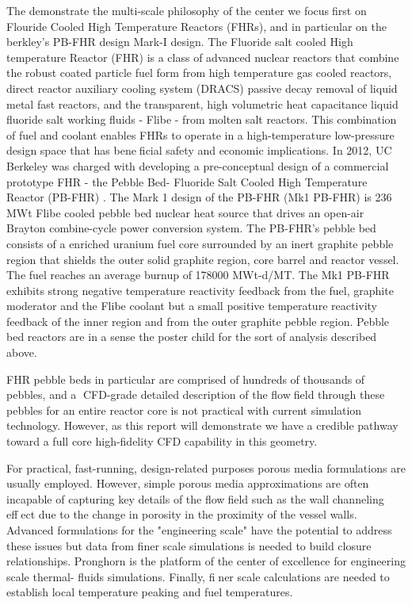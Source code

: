 The demonstrate the multi-scale philosophy of the center we focusfirst on Flouride Cooled High Temperature Reactors (FHRs), and in particular on the berkley's PB-FHR design Mark-I design. The Fluoride salt cooled High temperature Reactor (FHR) is a class of advanced nuclear reactors that combine the robust coated particle fuel form from high temperature gas cooled reactors, direct reactor auxiliary cooling system (DRACS) passive decay removal of liquid metal fast reactors, and the transparent, high volumetric heat capacitance liquid fluoride salt working fluids - Flibe - from molten salt reactors. This combination of fuel and coolant enables FHRs to operate in a high-temperature low-pressure design space that has beneficial safety and economic implications. In 2012, UC Berkeley was charged with developing a pre-conceptual design of a commercial prototype FHR - the Pebble Bed- Fluoride Salt Cooled High Temperature Reactor (PB-FHR) \cite{cisneros2014technical}. The Mark 1 design of the PB-FHR (Mk1 PB-FHR) is 236 MWt Flibe cooled pebble bed nuclear heat source that drives an open-air Brayton combine-cycle power conversion system. The PB-FHR's pebble bed consists of a enriched uranium fuel core surrounded by an inert graphite pebble region that shields the outer solid graphite region, core barrel and reactor vessel. The fuel reaches an average burnup of 178000 MWt-d/MT. The Mk1 PB-FHR exhibits strong negative temperature reactivity feedback from the fuel, graphite moderator and the Flibe coolant but a small positive temperature reactivity feedback of the inner region and from the outer graphite pebble region. Pebble bed reactors are in a sense the poster child for the sort of analysis described above.

FHR pebble beds in particular are comprised of hundreds of thousands of pebbles, and a CFD-grade detailed
description of the flowfield through these pebbles for an entire reactor core is not practical with current
simulation technology. However, as this report will demonstrate we have a credible pathway toward a full core high-fidelity CFD capability in this geometry.

For practical, fast-running, design-related purposes porous media formulations are usually employed. However, simple porous media approximations are often incapable of capturing key
details of the flowfield such as the wall channeling effect due to the change in porosity in the proximity of the vessel walls.  Advanced formulations for the "engineering scale" have the potential to address these issues but data from finer scale simulations is needed to build closure relationships. Pronghorn is the platform of the center of excellence for engineering scale thermal-
fluids simulations. Finally, finer scale calculations are needed to establish local temperature peaking and fuel temperatures.

